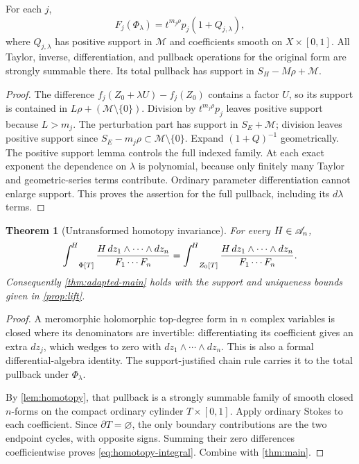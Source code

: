 \documentclass[11pt,letterpaper]{article}
\newtheorem{theorem}{Theorem}[section]
\theoremstyle{definition}
\theoremstyle{remark}
\newcommand{\HInt}{\mathop{\int^{\!H}}\nolimits}
\numberwithin{equation}{section}
\begin{document}
\begin{lemma}\label{lem:homotopy}
For each $j$,
\[
 F_j(\Phi_\lambda)=t^{m_j\rho}p_j(1+Q_{j,\lambda}),
\]
where $Q_{j,\lambda}$ has positive support in $\mathcal M$ and coefficients
smooth on $X\times[0,1]$. All Taylor, inverse, differentiation, and pullback
operations for the original form are strongly summable there. Its total
pullback has support in $S_H-M\rho+\mathcal M$.
\end{lemma}
\begin{proof}
The difference $f_j(Z_0+\lambda U)-f_j(Z_0)$ contains a factor $U$, so its
support is contained in $L\rho+(\mathcal M\setminus\{0\})$. Division by
$t^{m_j\rho}p_j$ leaves positive support because $L>m_j$. The perturbation
part has support in $S_E+\mathcal M$; division leaves positive support since
$S_E-m_j\rho\subset\mathcal M\setminus\{0\}$. Expand $(1+Q)^{-1}$
geometrically. The positive support lemma controls the full indexed family.
At each exact exponent the dependence on $\lambda$ is polynomial, because
only finitely many Taylor and geometric-series terms contribute. Ordinary
parameter differentiation cannot enlarge support. This proves the assertion
for the full pullback, including its $d\lambda$ terms.
\end{proof}

\begin{theorem}[Untransformed homotopy invariance]\label{thm:homotopy}
For every $H\in\mathscr A_n$,
\begin{equation}\label{eq:homotopy-integral}
 \HInt_{\Phi[T]}\frac{H\dz}{F_1\cdots F_n}
 =\HInt_{Z_0[T]}\frac{H\dz}{F_1\cdots F_n}.
\end{equation}
Consequently \cref{thm:adapted-main} holds with the support and uniqueness
bounds given in \cref{prop:lift}.
\end{theorem}
\begin{proof}
A meromorphic holomorphic top-degree form in $n$ complex variables is closed
where its denominators are invertible: differentiating its coefficient gives
an extra $dz_j$, which wedges to zero with $dz_1\wedge\cdots\wedge dz_n$.
This is also a formal differential-algebra identity. The support-justified
chain rule carries it to the total pullback under $\Phi_\lambda$.

By \cref{lem:homotopy}, that pullback is a strongly summable family of smooth
closed $n$-forms on the compact ordinary cylinder $T\times[0,1]$. Apply
ordinary Stokes to each coefficient. Since $\partial T=\varnothing$, the only
boundary contributions are the two endpoint cycles, with opposite signs.
Summing their zero differences coefficientwise proves
\eqref{eq:homotopy-integral}. Combine with \cref{thm:main}.
\end{proof}
\end{document}
